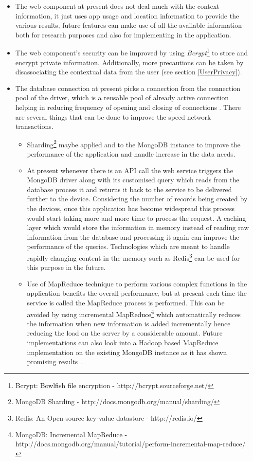 \documentclass[12pt]{report}
\begin{document}
\begin{itemize}

\item The web component at present does not deal much with the context information, it just uses app usage and location information to provide the various results, future features can make use of all the available information both for research purposes and also for implementing in the application. 

\item The web component's security can be improved by using \textit{Bcrypt}\footnote{Bcrypt: Bowlfish file encryption - http://bcrypt.sourceforge.net/} to store and encrypt private information. Additionally, more precautions can be taken by disassociating the contextual data from the user (see section \ref{UserPrivacy}).

\item The database connection at present picks a connection from the connection pool of the driver, which is a reusable pool of already active connection helping in reducing frequency of opening and closing of connections \cite{MongoLab2013}. There are several things that can be done to improve the speed network transactions.
    \begin{itemize}
        \item Sharding\footnote{MongoDB Sharding - http://docs.mongodb.org/manual/sharding/} maybe applied and to the MongoDB instance to improve the performance of the application and handle increase in the data needs.
        \item At present whenever there is an API call the web service triggers the MongoDB driver along with its customised query which reads from the database process it and returns it back to the service to be delivered further to the device. Considering the number of records being created by the devices, once this application has become widespread this process would start taking more and more time to process the request. A caching layer which would store the information in memory instead of reading raw information from the database and processing it again can improve the performance of the queries. Technologies which are meant to handle rapidly changing content in the memory such as Redis\footnote{Redis: An Open source key-value datastore - http://redis.io/} can be used for this purpose in the future.
        
       \item Use of MapReduce technique to perform various complex functions in the application benefits the overall performance, but at present each time the service is called the MapReduce process is performed. This can be avoided by using incremental MapReduce\footnote{MongoDB: Incremental MapReduce - http://docs.mongodb.org/manual/tutorial/perform-incremental-map-reduce/} which automatically reduces the information when new information is added incrementally hence reducing the load on the server by a considerable amount. Future implementations can also look into a Hadoop based MapReduce implementation on the existing MongoDB instance as it has shown promising results \cite{dede2013performance}.
    \end{itemize}


\end{itemize}
\end{document}
